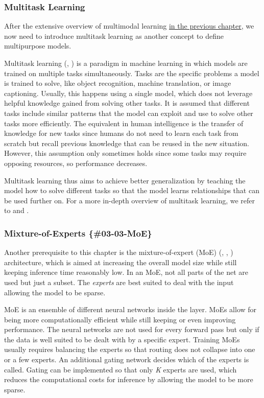 \documentclass[
]{krantz}
\begin{document}
\hypertarget{multitask-learning}{%
\subsubsection{Multitask Learning}\label{multitask-learning}}

After the extensive overview of multimodal learning \protect\hyperlink{c02-00-multimodal}{in the previous chapter}, we now need to introduce multitask learning as another concept to define
multipurpose models.

Multitask learning (\citet{Caruana1997}, \citet{Crawshaw2020}) is a paradigm in machine learning in which models are trained on multiple tasks simultaneously.
Tasks are the specific problems a model is trained to solve, like object recognition, machine translation, or image captioning. Usually, this happens using a single model,
which does not leverage helpful knowledge gained from solving other tasks. It is assumed that different tasks include similar patterns that the model can exploit and use
to solve other tasks more efficiently. The equivalent in human intelligence is the transfer of knowledge for new tasks since humans do not need to learn each task from scratch
but recall previous knowledge that can be reused in the new situation. However, this assumption only sometimes holds since some tasks may require opposing resources, so
performance decreases.

Multitask learning thus aims to achieve better generalization by teaching the model how to solve different tasks so that the model learns relationships that can be used
further on. For a more in-depth overview of multitask learning, we refer to \citep{Caruana1997} and \citep{Crawshaw2020}.

\hypertarget{mixture-of-experts-03-03-moe}{%
\subsubsection{Mixture-of-Experts \{\#03-03-MoE\}}\label{mixture-of-experts-03-03-moe}}

Another prerequisite to this chapter is the mixture-of-expert (MoE) (\citet{Jacobs1991}, \citet{Jordan1994}, \citet{Shaazer2017}) architecture, which is aimed at increasing the overall model
size while still keeping inference time reasonably low. In an MoE, not all parts of the net are used but just a subset. The \emph{experts} are best suited to deal with the input
allowing the model to be sparse.

MoE is an ensemble of different neural networks inside the layer. MoEs allow for being more computationally efficient while still keeping or even improving performance. The
neural networks are not used for every forward pass but only if the data is well suited to be dealt with by a specific expert. Training MoEs usually requires balancing the
experts so that routing does not collapse into one or a few experts. An additional gating network decides which of the experts is called. Gating can be implemented so that
only \emph{K} experts are used, which reduces the computational costs for inference by allowing the model to be more sparse.
\end{document}

